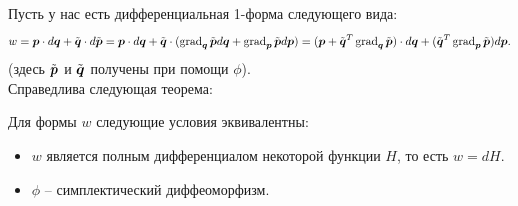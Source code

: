 Пусть у нас есть дифференциальная 1-форма следующего вида:
\[
    w = \boldsymbol{p}\cdot d\boldsymbol{q} + \tilde{\boldsymbol{q}}\cdot d\tilde{\boldsymbol{p}} = \boldsymbol{p}\cdot d\boldsymbol{q} + \tilde{\boldsymbol{q}} \cdot (\operatorname{grad}_{\boldsymbol{q}} \tilde{\boldsymbol{p}} d\boldsymbol{q} + \operatorname{grad}_{\boldsymbol{p}} \tilde{\boldsymbol{p}} d\boldsymbol{p}) = (\boldsymbol{p} + \tilde{\boldsymbol{q}}^T\operatorname{grad}_{\boldsymbol{q}} \tilde{\boldsymbol{p}})\cdot d\boldsymbol{q} + (\tilde{\boldsymbol{q}}^T\operatorname{grad}_{\boldsymbol{p}}\tilde{\boldsymbol{p}})d\boldsymbol{p}.
\]
(здесь $\tilde{\boldsymbol{p}}$ и $\tilde{\boldsymbol{q}}$ получены при помощи $\phi$). \\
Справедлива следующая теорема:
\begin{theorem}
    Для формы $w$ следующие условия эквивалентны:
    \begin{itemize}
        \item $w$ является полным дифференциалом некоторой функции $H$, то есть $w = dH$.
        \item $\phi$ -- симплектический диффеоморфизм.
    \end{itemize}
\end{theorem}
